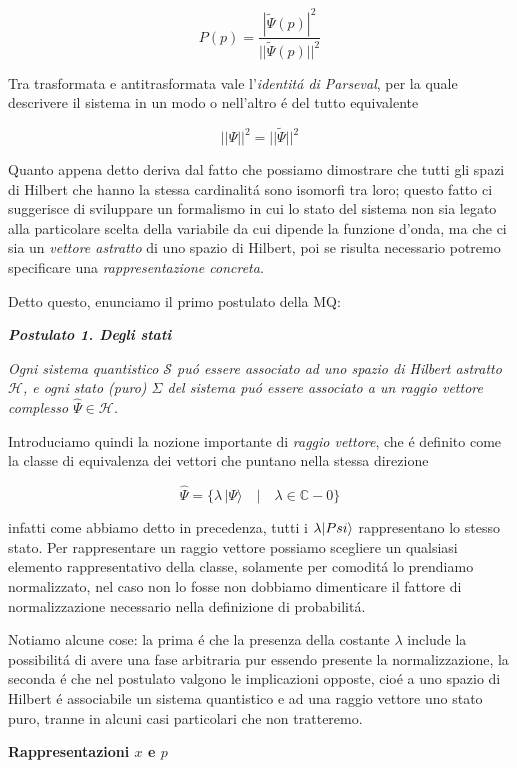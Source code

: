 $$P(p)=\frac{|\tilde{\Psi}(p)|^{2}}{||\tilde{\Psi}(p)||^{2}}$$

Tra trasformata e antitrasformata vale l'\textit{identit\'a di Parseval}, per la quale descrivere il sistema in un modo o nell'altro \'e del tutto equivalente 

$$||\Psi||^2 = ||\tilde{\Psi}||^2$$

Quanto appena detto deriva dal fatto che possiamo dimostrare che tutti gli spazi di Hilbert che hanno la stessa cardinalit\'a sono isomorfi tra loro; questo fatto ci suggerisce di sviluppare un formalismo in cui lo stato del sistema non sia legato alla particolare scelta della variabile da cui dipende la funzione d'onda, ma che ci sia un \textit{vettore astratto} di uno spazio di Hilbert, poi se risulta necessario potremo specificare una \textit{rappresentazione concreta}.

Detto questo, enunciamo il primo postulato della MQ:

\textbf{\textit{Postulato 1. Degli stati}} 

\textit{Ogni sistema quantistico $\mathcal{S}$ pu\'o essere associato ad uno spazio di Hilbert astratto $\mathcal{H}$, e ogni stato (puro) $\Sigma$ del sistema pu\'o essere associato a un raggio vettore complesso $\hat{\Psi} \in \mathcal{H}$.}

Introduciamo quindi la nozione importante di \textit{raggio vettore}, che \'e definito come la classe di equivalenza dei vettori che puntano nella stessa direzione

$${\hat{\Psi}}=\{\lambda\,|\Psi\rangle\quad\big|\quad\lambda\in\mathbb{C}-0\}$$

infatti come abbiamo detto in precedenza, tutti i $\lambda \normalsize| Psi \normalsize\rangle$ rappresentano lo stesso stato. Per rappresentare un raggio vettore possiamo scegliere un qualsiasi elemento rappresentativo della classe, solamente per comodit\'a lo prendiamo normalizzato, nel caso non lo fosse non dobbiamo dimenticare il fattore di normalizzazione necessario nella definizione di probabilit\'a.

Notiamo alcune cose: la prima \'e che la presenza della costante $\lambda$ include la possibilit\'a di avere una fase arbitraria pur essendo presente la normalizzazione, la seconda \'e che nel postulato valgono le implicazioni opposte, cio\'e a uno spazio di Hilbert \'e associabile un sistema quantistico e ad una raggio vettore uno stato puro, tranne in alcuni casi particolari che non tratteremo.


\textbf{Rappresentazioni $x$ e $p$}


